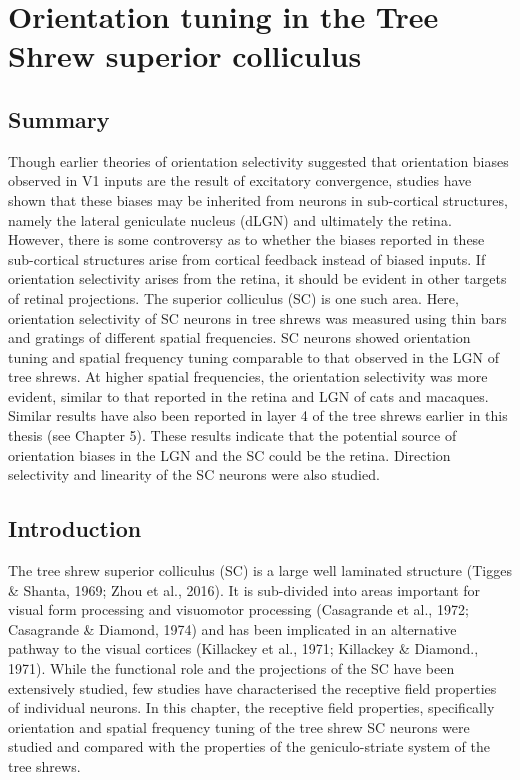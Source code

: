 

	\chapter{Orientation tuning in the Tree Shrew superior colliculus}

	\pagebreak
	\section{Summary}
	
	Though earlier theories of orientation selectivity suggested that orientation biases observed in V1 inputs are the result of excitatory convergence, studies have shown that these biases may be inherited from neurons in sub-cortical structures, namely the lateral geniculate nucleus (dLGN) and ultimately the retina. However, there is some controversy as to whether the biases reported in these sub-cortical structures arise from cortical feedback instead of biased inputs. If orientation selectivity arises from the retina, it should be evident in other targets of retinal projections. The superior colliculus (SC) is one such area. Here, orientation selectivity of SC neurons in tree shrews was measured using thin bars and gratings of different spatial frequencies. SC neurons showed orientation tuning and spatial frequency tuning comparable to that observed in the LGN of tree shrews. At higher spatial frequencies, the orientation selectivity was more evident, similar to that reported in the retina and LGN of cats and macaques. Similar results have also been reported in layer 4 of the tree shrews earlier in this thesis (see Chapter 5). These results indicate that the potential source of orientation biases in the LGN and the SC could be the retina. Direction selectivity and linearity of the SC neurons were also studied.
	
	\pagebreak
	
	
	\section{Introduction}
	
The tree shrew superior colliculus (SC) is a large well laminated structure (Tigges \& Shanta, 1969; Zhou et al., 2016). It is sub-divided into areas important for visual form processing and visuomotor processing (Casagrande et al., 1972; Casagrande \& Diamond, 1974) and has been implicated in an alternative pathway to the visual cortices (Killackey et al., 1971; Killackey \& Diamond., 1971). While the functional role and the projections of the SC have been extensively studied, few studies have characterised the receptive field properties of individual neurons. In this chapter, the receptive field properties, specifically orientation and spatial frequency tuning of the tree shrew SC neurons were studied and compared with the properties of the geniculo-striate system of the tree shrews.
 
